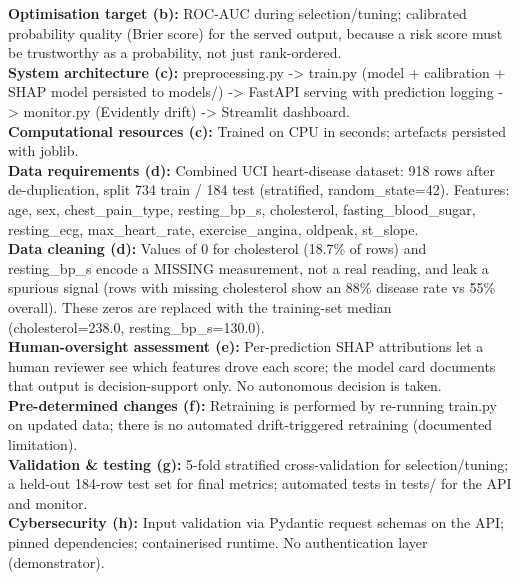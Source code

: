 \documentclass[11pt,a4paper]{article}
\begin{document}
\textbf{Optimisation target (b):} ROC-AUC during selection/tuning; calibrated probability quality (Brier score) for the served output, because a risk score must be trustworthy as a probability, not just rank-ordered.\\

\textbf{System architecture (c):} preprocessing.py -> train.py (model + calibration + SHAP model persisted to models/) -> FastAPI serving with prediction logging -> monitor.py (Evidently drift) -> Streamlit dashboard.\\

\textbf{Computational resources (c):} Trained on CPU in seconds; artefacts persisted with joblib.\\

\textbf{Data requirements (d):} Combined UCI heart-disease dataset: 918 rows after de-duplication, split 734 train / 184 test (stratified, random\_state=42). Features: age, sex, chest\_pain\_type, resting\_bp\_s, cholesterol, fasting\_blood\_sugar, resting\_ecg, max\_heart\_rate, exercise\_angina, oldpeak, st\_slope.\\

\textbf{Data cleaning (d):} Values of 0 for cholesterol (18.7\% of rows) and resting\_bp\_s encode a MISSING measurement, not a real reading, and leak a spurious signal (rows with missing cholesterol show an 88\% disease rate vs 55\% overall). These zeros are replaced with the training-set median (cholesterol=238.0, resting\_bp\_s=130.0).\\

\textbf{Human-oversight assessment (e):} Per-prediction SHAP attributions let a human reviewer see which features drove each score; the model card documents that output is decision-support only. No autonomous decision is taken.\\

\textbf{Pre-determined changes (f):} Retraining is performed by re-running train.py on updated data; there is no automated drift-triggered retraining (documented limitation).\\

\textbf{Validation \& testing (g):} 5-fold stratified cross-validation for selection/tuning; a held-out 184-row test set for final metrics; automated tests in tests/ for the API and monitor.\\

\textbf{Cybersecurity (h):} Input validation via Pydantic request schemas on the API; pinned dependencies; containerised runtime. No authentication layer (demonstrator).\\
\end{document}
